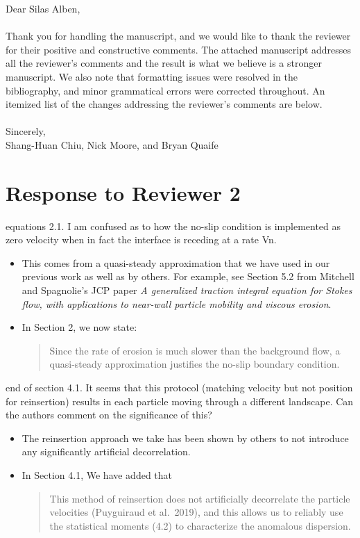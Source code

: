 \documentclass[11pt]{article}
\newcommand{\comment}[1]{{\color{blue} #1}}
\begin{document}
\noindent
Dear Silas Alben,
\\ \\
\noindent
Thank you for handling the manuscript, and we would like to thank the
reviewer for their positive and constructive comments.  The attached
manuscript addresses all the reviewer's comments and the result is what
we believe is a stronger manuscript.  We also note that formatting
issues were resolved in the bibliography, and minor grammatical errors
were corrected throughout. An itemized list of the changes addressing
the reviewer's comments are below.
\\ \\
\noindent
Sincerely,
\\
\noindent
Shang-Huan Chiu, Nick Moore, and Bryan Quaife

\section*{Response to Reviewer 2}

\noindent
\comment{equations 2.1.  I am confused as to how the no-slip condition
is implemented as zero velocity when in fact the interface is receding
at a rate Vn.}
\begin{itemize}
  \item This comes from a quasi-steady approximation that we have used
    in our previous work as well as by others. For example, see Section
    5.2 from Mitchell and Spagnolie's JCP paper {\em A generalized
    traction integral equation for Stokes flow, with applications to
    near-wall particle mobility and viscous erosion}.

  \item In Section 2, we now state:
    \begin{quotation}
      \noindent
      Since the rate of erosion is much slower than the background flow,
      a quasi-steady approximation justifies the no-slip boundary
      condition.
    \end{quotation}
\end{itemize}

\noindent
\comment{end of section 4.1.  It seems that this protocol (matching
velocity but not position for reinsertion) results in each particle
moving through a different landscape.  Can the authors comment on the
significance of this?}
\begin{itemize}
  \item The reinsertion approach we take has been shown by others to not
    introduce any significantly artificial decorrelation.

  \item In Section 4.1, We have added that
    \begin{quotation}
      \noindent
      This method of reinsertion does not artificially decorrelate the
      particle velocities (Puyguiraud et al.~2019), and this allows us
      to reliably use the statistical moments (4.2) to characterize the
      anomalous dispersion.
    \end{quotation}

\end{itemize}
\end{document}
